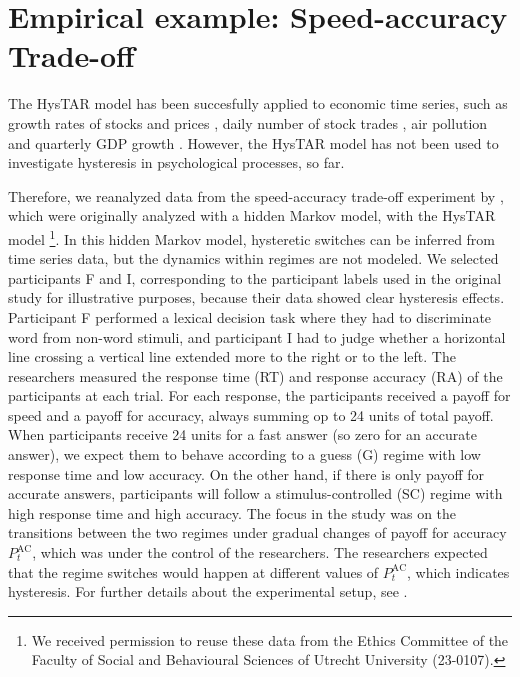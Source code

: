 \documentclass{article}
\begin{document}


\section{Empirical example: Speed-accuracy Trade-off} \label{sec:empirical_example}
The HysTAR model has been succesfully applied to economic time series, such as growth rates of stocks and prices \citep{tsay}, daily number of stock trades \citep{liu}, air pollution \citep{chen} and quarterly GDP growth \citep{bar2}. However, the HysTAR model has not been used to investigate hysteresis in psychological processes, so far.

Therefore, we reanalyzed data from the speed-accuracy trade-off experiment by \citet[][experiment 1b]{speedaccuracy}, which were originally analyzed with a hidden Markov model, with the HysTAR model \footnote{We received permission to reuse these data from the Ethics Committee of the Faculty of Social and Behavioural Sciences of Utrecht University (23-0107).}.
In this hidden Markov model, hysteretic switches can be inferred from time series data, but the dynamics within regimes are not modeled.
We selected participants F and I, corresponding to the participant labels used in the original study for illustrative purposes, because their data showed clear hysteresis effects.
Participant F performed a lexical decision task where they had to discriminate word from non-word stimuli, and participant I had to judge whether a horizontal line crossing a vertical line extended more to the right or to the left.
The researchers measured the response time (RT) and response accuracy (RA) of the participants at each trial.
For each response, the participants received a payoff for speed and a payoff for accuracy, always summing op to 24 units of total payoff.
When participants receive 24 units for a fast answer (so zero for an accurate answer), we expect them to behave according to a guess (G) regime with low response time and low accuracy.
On the other hand, if there is only payoff for accurate answers, participants will follow a stimulus-controlled (SC) regime with high response time and high accuracy.
The focus in the study was on the transitions between the two regimes under gradual changes of payoff for accuracy $P^{\mathrm{AC}}_t$, which was under the control of the researchers.
The researchers expected that the regime switches would happen at different values of $P^{\mathrm{AC}}_t$, which indicates hysteresis.
For further details about the experimental setup, see \citet{speedaccuracy}.
\end{document}
